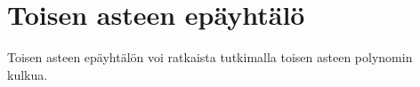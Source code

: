 \section{Toisen asteen epäyhtälö}



Toisen asteen epäyhtälön voi ratkaista tutkimalla toisen asteen polynomin kulkua.


